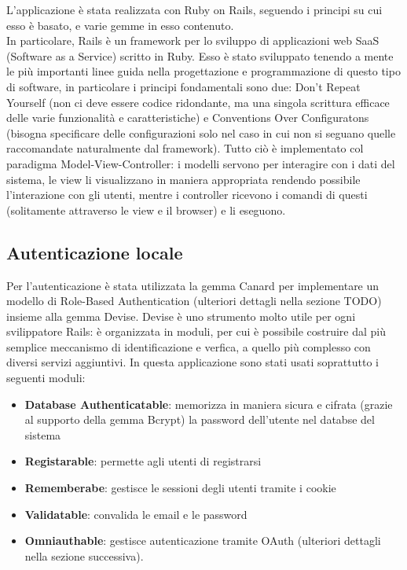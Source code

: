 \documentclass[Lau, binding=0.6cm]{sapthesis}
\begin{document}
L’applicazione è stata realizzata con Ruby on Rails, seguendo i principi su cui esso è basato, e varie gemme in esso contenuto.\\
In particolare, Rails è un framework per lo sviluppo di applicazioni web SaaS (Software as a Service) scritto in Ruby. Esso è stato sviluppato tenendo a mente le più importanti linee guida nella progettazione e programmazione di questo tipo di software, in particolare i principi fondamentali sono due: Don’t Repeat Yourself (non ci deve essere codice ridondante, ma una singola scrittura efficace delle varie funzionalità e caratteristiche) e Conventions Over Configuratons (bisogna specificare delle configurazioni solo nel caso in cui non si seguano quelle raccomandate naturalmente dal framework).
Tutto ciò è implementato col paradigma Model-View-Controller: i modelli servono per interagire con i dati del sistema, le view li visualizzano in maniera appropriata rendendo possibile l’interazione con gli utenti, mentre i controller ricevono i comandi di questi (solitamente attraverso le view e il browser) e li eseguono.

\subsection{Autenticazione locale}

Per l’autenticazione è stata utilizzata la gemma Canard per implementare un modello di Role-Based Authentication (ulteriori dettagli nella sezione TODO) insieme alla gemma Devise.
Devise è uno strumento molto utile per ogni svilippatore Rails: è organizzata in moduli, per cui è possibile costruire dal più semplice meccanismo di identificazione e verfica, a quello più complesso con diversi servizi aggiuntivi. In questa applicazione sono stati usati soprattutto i seguenti moduli:

\begin{itemize}
	\item \textbf{Database Authenticatable}: memorizza in maniera sicura e cifrata (grazie al supporto della gemma Bcrypt) la password dell’utente nel databse del sistema
	\item \textbf{Registarable}: permette agli utenti di registrarsi
	\item \textbf{Rememberabe}: gestisce le sessioni degli utenti tramite i cookie
	\item \textbf{Validatable}: convalida le email e le password
	\item \textbf{Omniauthable}: gestisce autenticazione tramite OAuth (ulteriori dettagli nella sezione successiva).
\end{itemize}
\end{document}
